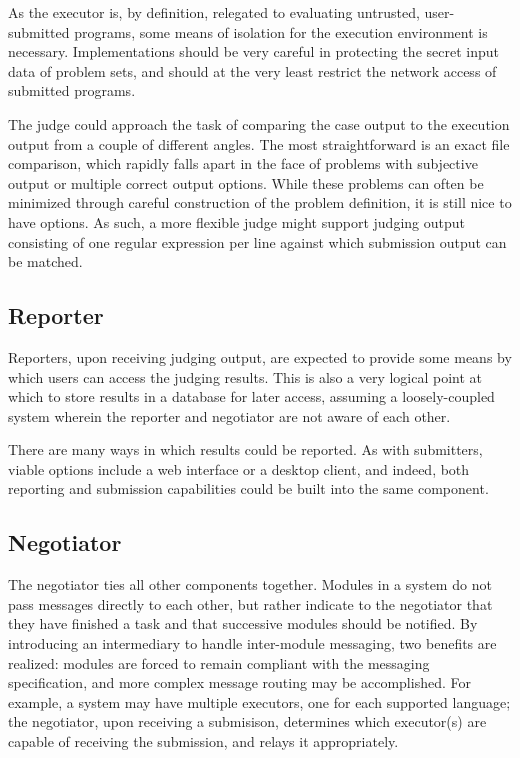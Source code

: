 \documentclass[11pt,letterpaper]{article}
\begin{document}
As the executor is, by definition, relegated to evaluating untrusted,
user-submitted programs, some means of isolation for the execution environment
is necessary. Implementations should be very careful in protecting the secret
input data of problem sets, and should at the very least restrict the network
access of submitted programs.

The judge could approach the task of comparing the case output to the execution
output from a couple of different angles. The most straightforward is an exact
file comparison, which rapidly falls apart in the face of problems with
subjective output or multiple correct output options. While these problems
can often be minimized through careful construction of the problem definition,
it is still nice to have options. As such, a more flexible judge might support
judging output consisting of one regular expression per line against which
submission output can be matched.

\subsection{Reporter}
\label{design-reporter}

Reporters, upon receiving judging output, are expected to provide some means by
which users can access the judging results. This is also a very logical point
at which to store results in a database for later access, assuming a
loosely-coupled system wherein the reporter and negotiator are not aware of
each other.

There are many ways in which results could be reported. As with submitters,
viable options include a web interface or a desktop client, and indeed, both
reporting and submission capabilities could be built into the same component.

\subsection{Negotiator}
\label{design-hub}

The negotiator ties all other components together. Modules in a system do not
pass messages directly to each other, but rather indicate to the negotiator
that they have finished a task and that successive modules should be notified.
By introducing an intermediary to handle inter-module messaging, two benefits
are realized: modules are forced to remain compliant with the messaging
specification, and more complex message routing may be accomplished. For
example, a system may have multiple executors, one for each supported language;
the negotiator, upon receiving a submisison, determines which executor(s) are
capable of receiving the submission, and relays it appropriately.
\end{document}
